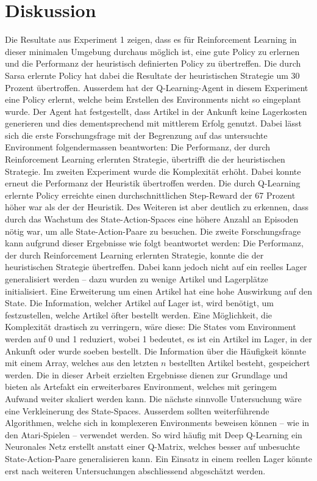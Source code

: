 \chapter{Diskussion}

Die Resultate aus Experiment 1 zeigen, dass es für Reinforcement Learning in dieser minimalen Umgebung durchaus möglich ist, eine gute Policy zu erlernen und die Performanz der heuristisch definierten Policy zu übertreffen. Die durch Sarsa erlernte Policy hat dabei die Resultate der heuristischen Strategie um 30 Prozent übertroffen. Ausserdem hat der Q-Learning-Agent in diesem Experiment eine Policy erlernt, welche beim Erstellen des Environments nicht so eingeplant wurde. Der Agent hat festgestellt, dass Artikel in der Ankunft keine Lagerkosten generieren und dies dementsprechend mit mittlerem Erfolg genutzt. Dabei lässt sich die erste Forschungsfrage mit der Begrenzung auf das untersuchte Environment folgendermassen beantworten: Die Performanz, der durch Reinforcement Learning erlernten Strategie, übertrifft die der heuristischen Strategie.
Im zweiten Experiment wurde die Komplexität erhöht. Dabei konnte erneut die Performanz der Heuristik übertroffen werden. Die durch Q-Learning erlernte Policy erreichte einen durchschnittlichen Step-Reward der 67 Prozent höher war als der der Heuristik. Des Weiteren ist aber deutlich zu erkennen, dass durch das Wachstum des State-Action-Spaces eine höhere Anzahl an Episoden nötig war, um alle State-Action-Paare zu besuchen. Die zweite Forschungsfrage kann aufgrund dieser Ergebnisse wie folgt beantwortet werden: Die Performanz, der durch Reinforcement Learning erlernten Strategie, konnte die der heuristischen Strategie übertreffen. Dabei kann jedoch nicht auf ein reelles Lager generalisiert werden – dazu wurden zu wenige Artikel und Lagerplätze initialisiert. Eine Erweiterung um einen Artikel hat eine hohe Auswirkung auf den State. Die Information, welcher Artikel auf Lager ist, wird benötigt, um festzustellen, welche Artikel öfter bestellt werden. Eine Möglichkeit, die Komplexität drastisch zu verringern, wäre diese: Die States vom Environment werden auf 0 und 1 reduziert, wobei 1 bedeutet, es ist ein Artikel im Lager, in der Ankunft oder wurde soeben bestellt. Die Information über die Häufigkeit könnte mit einem Array, welches aus den letzten $n$ bestellten Artikel besteht, gespeichert werden.
Die in dieser Arbeit erzielten Ergebnisse dienen zur Grundlage und bieten als Artefakt ein erweiterbares Environment, welches mit geringem Aufwand weiter skaliert werden kann. Die nächste sinnvolle Untersuchung wäre eine Verkleinerung des State-Spaces. Ausserdem sollten weiterführende Algorithmen, welche sich in komplexeren Environments beweisen können – wie in den Atari-Spielen \cite{mnih2013playing} – verwendet werden. So wird häufig mit Deep Q-Learning ein Neuronales Netz erstellt anstatt einer Q-Matrix, welches besser auf unbesuchte State-Action-Paare generalisieren kann.
Ein Einsatz in einem reellen Lager könnte erst nach weiteren Untersuchungen abschliessend abgeschätzt werden. 
